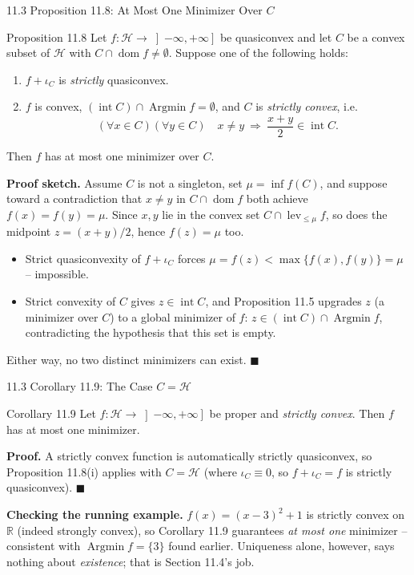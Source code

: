 \documentclass[aspectratio=169,10pt]{beamer}
\newcommand{\mHH}{\mathcal H}
\newcommand{\R}{\mathbb{R}}
\newcommand{\dom}{\operatorname{dom}}
\newcommand{\Argmin}{\operatorname{Argmin}}
\newcommand{\lev}{\operatorname{lev}}
\newcommand{\iC}{\iota_C}
\newcommand{\intr}{\operatorname{int}}
\begin{document}
\begin{frame}{11.3 Proposition 11.8: At Most One Minimizer Over $C$}

  \begin{block}{Proposition 11.8}
    Let $f:\mHH\to\left]-\infty,+\infty\right]$ be quasiconvex and let
    $C$ be a convex subset of $\mHH$ with $C\cap\dom f\neq\emptyset$.
    Suppose one of the following holds:
    \begin{enumerate}
      \item[(i)] $f+\iC$ is \emph{strictly} quasiconvex.
      \item[(ii)] $f$ is convex, $(\intr C)\cap\Argmin f=\emptyset$,
            and $C$ is \emph{strictly convex}, i.e.\
            \[
              (\forall x\in C)(\forall y\in C)\quad x\neq y\ \Rightarrow\
              \frac{x+y}{2}\in\intr C.
            \]
    \end{enumerate}
    Then $f$ has at most one minimizer over $C$.
  \end{block}

  \textbf{Proof sketch.} Assume $C$ is not a singleton, set
  $\mu=\inf f(C)$, and suppose toward a contradiction that $x\neq y$
  in $C\cap\dom f$ both achieve $f(x)=f(y)=\mu$. Since $x,y$ lie in
  the convex set $C\cap\lev_{\le\mu}f$, so does the midpoint
  $z=(x+y)/2$, hence $f(z)=\mu$ too.
  \begin{itemize}
    \item[(i)] Strict quasiconvexity of $f+\iC$ forces
          $\mu=f(z)<\max\{f(x),f(y)\}=\mu$ -- impossible.
    \item[(ii)] Strict convexity of $C$ gives $z\in\intr C$, and
          Proposition 11.5 upgrades $z$ (a minimizer over $C$) to a
          global minimizer of $f$: $z\in(\intr C)\cap\Argmin f$,
          contradicting the hypothesis that this set is empty.
  \end{itemize}
  Either way, no two distinct minimizers can exist. \hfill$\blacksquare$

\end{frame}

\begin{frame}{11.3 Corollary 11.9: The Case $C=\mHH$}

  \begin{block}{Corollary 11.9}
    Let $f:\mHH\to\left]-\infty,+\infty\right]$ be proper and
    \emph{strictly convex}. Then $f$ has at most one minimizer.
  \end{block}

  \textbf{Proof.} A strictly convex function is automatically
  strictly quasiconvex, so Proposition 11.8(i) applies with $C=\mHH$
  (where $\iC\equiv0$, so $f+\iC=f$ is strictly quasiconvex).
  \hfill$\blacksquare$

  \vspace{0.5em}
  \textbf{Checking the running example.} $f(x)=(x-3)^2+1$ is strictly
  convex on $\R$ (indeed strongly convex), so Corollary 11.9
  guarantees \emph{at most one} minimizer -- consistent with
  $\Argmin f=\{3\}$ found earlier. Uniqueness alone, however, says
  nothing about \emph{existence}; that is Section 11.4's job.

\end{frame}
\end{document}
